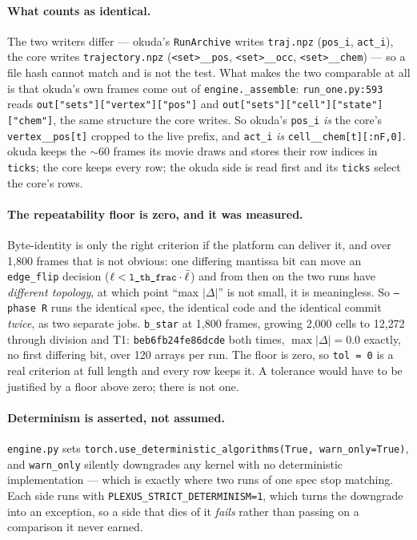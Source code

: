 \documentclass[11pt,a4paper]{article}
\newcommand{\code}[1]{\texttt{\small #1}}
\begin{document}
\paragraph{What counts as identical.} The two writers differ --- okuda's \code{RunArchive} writes
\code{traj.npz} (\code{pos\_i}, \code{act\_i}), the core writes \code{trajectory.npz}
(\code{<set>\_\_pos}, \code{<set>\_\_occ}, \code{<set>\_\_chem}) --- so a file hash cannot match and
is not the test. What makes the two comparable at all is that okuda's own frames come out of
\code{engine.\_assemble}: \code{run\_one.py:593} reads \code{out["sets"]["vertex"]["pos"]} and
\code{out["sets"]["cell"]["state"]["chem"]}, the same structure the core writes. So okuda's
\code{pos\_i} \emph{is} the core's \code{vertex\_\_pos[t]} cropped to the live prefix, and
\code{act\_i} \emph{is} \code{cell\_\_chem[t][:nF,0]}. okuda keeps the ${\sim}60$ frames its movie
draws and stores their row indices in \code{ticks}; the core keeps every row; the okuda side is read
first and its \code{ticks} select the core's rows.

\paragraph{The repeatability floor is zero, and it was measured.} Byte-identity is only the right
criterion if the platform can deliver it, and over 1{,}800 frames that is not obvious: one differing
mantissa bit can move an \code{edge\_flip} decision ($\ell < \code{l\_th\_frac}\cdot\bar{\ell}$) and
from then on the two runs have \emph{different topology}, at which point ``max $|\Delta|$'' is not
small, it is meaningless. So \code{--phase R} runs the identical spec, the identical code and the
identical commit \emph{twice}, as two separate jobs. \code{b\_star} at 1{,}800 frames, growing 2{,}000
cells to 12{,}272 through division and T1: \code{beb6fb24fe86dcde} both times, $\max|\Delta| = 0.0$
exactly, no first differing bit, over 120 arrays per run. The floor is zero, so \code{tol = 0} is a
real criterion at full length and every row keeps it. A tolerance would have to be justified by a
floor above zero; there is not one.

\paragraph{Determinism is asserted, not assumed.} \code{engine.py} sets
\code{torch.use\_deterministic\_algorithms(True, warn\_only=True)}, and \code{warn\_only} silently
downgrades any kernel with no deterministic implementation --- which is exactly where two runs of one
spec stop matching. Each side runs with \code{PLEXUS\_STRICT\_DETERMINISM=1}, which turns the
downgrade into an exception, so a side that dies of it \emph{fails} rather than passing on a
comparison it never earned.
\end{document}
